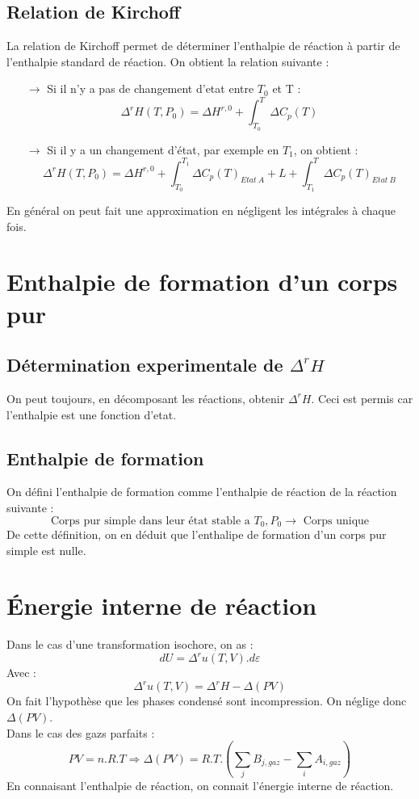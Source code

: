 \subsection{Relation de Kirchoff}
\begin{enon}
La relation de Kirchoff permet de déterminer l'enthalpie de réaction à partir de l'enthalpie standard de réaction. On obtient la relation suivante : 
\begin{itemize}
 \item[$\rightarrow$] Si il n'y a pas de changement d'etat entre $T_0$ et T : 
$$\Delta^r H(T,P_0) = \Delta H^{r,0} + \int_{T_0}^T \Delta C_p(T)$$
 \item[$\rightarrow$] Si il y a un changement d'état, par exemple en $T_1$, on obtient : 
$$\Delta^r H(T,P_0) = \Delta H^{r,0} + \int_{T_0}^{T_1} \Delta C_p(T)_{Etat~ A}+ L + \int_{T_1}^T \Delta C_p(T)_{Etat~ B}$$
\end{itemize}
En général on peut fait une approximation en négligent les intégrales à chaque fois.
\end{enon}
\section{Enthalpie de formation d'un corps pur}
\subsection{Détermination experimentale de $\Delta^r H$}
On peut toujours, en décomposant les réactions, obtenir $\Delta^r H$. Ceci est permis car l'enthalpie est une fonction d'etat.
\subsection{Enthalpie de formation}
On défini l'enthalpie de formation comme l'enthalpie de réaction de la réaction suivante : 
$$\mbox{ Corps pur simple dans leur état stable a }T_0,P_0 \rightarrow \mbox{ Corps unique }$$
De cette définition, on en déduit que l'enthalipe de formation d'un corps pur simple est nulle.
\section{Énergie interne de réaction}
\begin{de}
Dans le cas d'une transformation isochore, on as : 
$$dU = \Delta^r u(T,V).d\varepsilon$$
Avec : 
$$\Delta^r u(T,V) = \Delta^r H - \Delta(PV)$$
On fait l'hypothèse que les phases condensé sont incompression. On néglige donc $\Delta(PV)$.\\
Dans le cas des gazs parfaits : 
$$PV = n.R.T \Rightarrow \Delta(PV) = R.T.(\sum_j B_{j,gaz} - \sum_i A_{i,gaz})$$
En connaisant l'enthalpie de réaction, on connait l'énergie interne de réaction.
\end{de}
